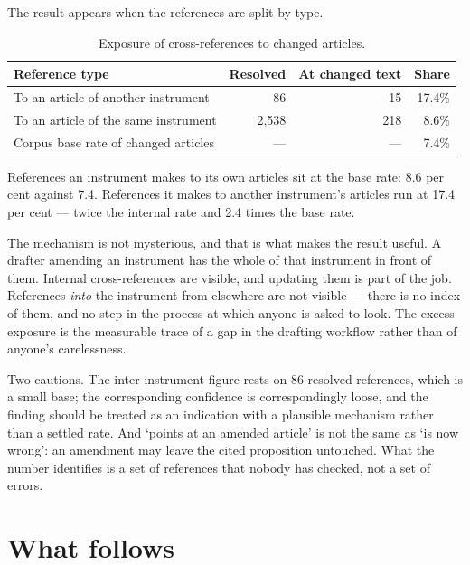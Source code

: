 \documentclass[11pt]{article}
\begin{document}
The result appears when the references are split by type.

\begin{table}[t]
\centering
\small
\begin{tabular}{lrrr}
\toprule
\textbf{Reference type} & \textbf{Resolved} & \textbf{At changed text} &
\textbf{Share} \\
\midrule
To an article of another instrument & 86 & 15 & 17.4\% \\
To an article of the same instrument & 2,538 & 218 & 8.6\% \\
\midrule
Corpus base rate of changed articles & --- & --- & 7.4\% \\
\bottomrule
\end{tabular}
\caption{Exposure of cross-references to changed articles.}
\label{tab:exposure}
\end{table}

References an instrument makes to its own articles sit at the base rate: 8.6
per cent against 7.4. References it makes to another instrument's articles run
at 17.4 per cent --- twice the internal rate and 2.4 times the base rate.

The mechanism is not mysterious, and that is what makes the result useful. A
drafter amending an instrument has the whole of that instrument in front of
them. Internal cross-references are visible, and updating them is part of the
job. References \emph{into} the instrument from elsewhere are not visible ---
there is no index of them, and no step in the process at which anyone is asked
to look. The excess exposure is the measurable trace of a gap in the drafting
workflow rather than of anyone's carelessness.

Two cautions. The inter-instrument figure rests on 86 resolved references,
which is a small base; the corresponding confidence is correspondingly loose,
and the finding should be treated as an indication with a plausible mechanism
rather than a settled rate. And `points at an amended article' is not the same
as `is now wrong': an amendment may leave the cited proposition untouched.
What the number identifies is a set of references that nobody has checked, not
a set of errors.

\section{What follows}
\end{document}
